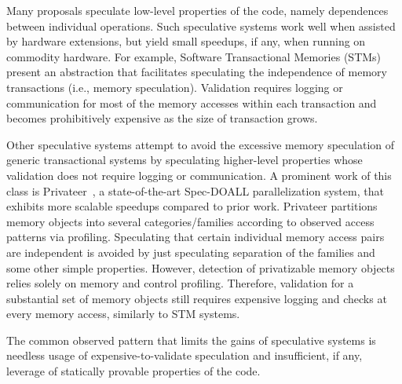 Many proposals speculate low-level properties of the code, namely dependences
between individual operations.
Such speculative systems work well when assisted by hardware
extensions, but yield small speedups, if any, when
running on commodity hardware.
For example, Software Transactional Memories
(STMs)~\cite{mehrara:09:stmlite} present an abstraction that facilitates
speculating the independence of memory transactions (i.e., memory
speculation). Validation requires logging or communication for most of the
memory accesses within each transaction and becomes prohibitively expensive
as the size of transaction grows.
%

Other speculative systems attempt to avoid the excessive memory speculation of
generic transactional systems by speculating higher-level properties whose
validation does not require logging or communication.
%
A prominent work of this class is Privateer~\cite{johnson:12:pldi:short}, a
state-of-the-art Spec-DOALL parallelization system, that exhibits more
scalable speedups compared to prior work.
%
Privateer partitions memory objects into several categories/families according
to observed access patterns via profiling.  Speculating that certain
individual memory access pairs are independent is avoided by just speculating
separation of the families and some other simple properties.  However, detection
of privatizable memory objects relies solely on memory and control profiling.
Therefore, validation for a substantial set of memory objects still requires
expensive logging and checks at every memory access, similarly to STM systems.
%

The common observed pattern that limits the gains of speculative systems is
needless usage of expensive-to-validate speculation and insufficient, if any,
leverage of statically provable properties of the code.

